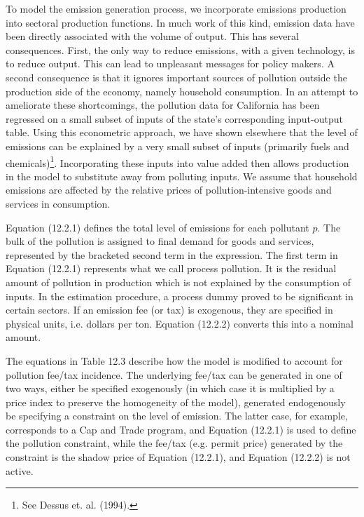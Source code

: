 \documentclass{article}
\begin{document}
To model the emission generation process, we incorporate emissions production into sectoral production functions. In much work of this kind, emission data have been directly associated with the volume of output. This has several consequences. First, the only way to reduce emissions, with a given technology, is to reduce output. This can lead to unpleasant messages for policy makers. A second consequence is that it ignores important sources of pollution outside the production side of the economy, namely household consumption. In an attempt to ameliorate these shortcomings, the pollution data for California has been regressed on a small subset of inputs of the state's corresponding input-output table. Using this econometric approach, we have shown elsewhere that the level of emissions can be explained by a very small subset of inputs (primarily fuels and chemicals)\footnote{See Dessus et. al. (1994).}. Incorporating these inputs into value added then allows production in the model to substitute away from polluting inputs. We assume that household emissions are affected by the relative prices of pollution-intensive goods and services in consumption.

Equation (12.2.1) defines the total level of emissions for each pollutant $p$. The bulk of the pollution is assigned to final demand for goods and services, represented by the bracketed second term in the expression. The first term in Equation (12.2.1) represents what we call process pollution. It is the residual amount of pollution in production which is not explained by the consumption of inputs. In the estimation procedure, a process dummy proved to be significant in certain sectors. If an emission fee (or tax) is exogenous, they are specified in physical units, i.e. dollars per ton. Equation (12.2.2) converts this into a nominal amount.

The equations in Table 12.3 describe how the model is modified to account for pollution fee/tax incidence. The underlying fee/tax can be generated in one of two ways, either be specified exogenously (in which case it is multiplied by a price index to preserve the homogeneity of the model), generated endogenously be specifying a constraint on the level of emission. The latter case, for example, corresponds to a Cap and Trade program, and Equation (12.2.1) is used to define the pollution constraint, while the fee/tax (e.g. permit price) generated by the constraint is the shadow price of Equation (12.2.1), and Equation (12.2.2) is not active.
\end{document}
